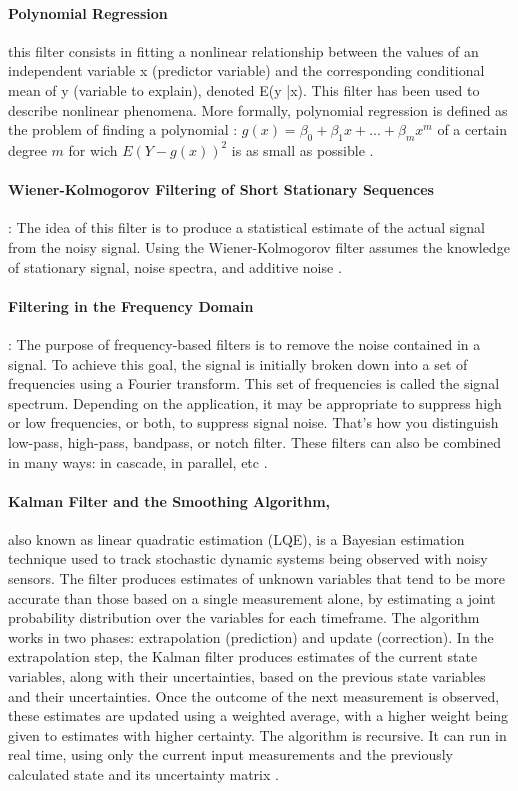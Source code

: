\paragraph{Polynomial Regression} this filter consists in fitting a nonlinear relationship between the values of an independent variable x (predictor variable)  and the corresponding conditional mean of y (variable to explain), denoted E(y |x). This filter has been used to describe nonlinear phenomena. More formally, polynomial regression is defined as the problem of finding a polynomial :  $g(x)=\beta_{0}+\beta_{1}x+...+\beta_{m}x^{m}$ of a certain degree $m$ for wich $E(Y-g(x))^{2}$ is as small as possible \cite{kendall1961advanced}.

\paragraph{Wiener-Kolmogorov Filtering of Short Stationary Sequences} : 
The idea of this filter is to produce a statistical estimate of the actual signal from the noisy signal. Using the Wiener-Kolmogorov filter assumes the knowledge of stationary signal, noise spectra, and additive noise \cite{pollock2007wiener}.

\paragraph{Filtering in the Frequency Domain}  : The purpose of frequency-based filters is to remove the noise contained in a signal. To achieve this goal, the signal is initially broken down into a set of frequencies using a Fourier transform. This set of frequencies is called the signal spectrum. Depending on the application, it may be appropriate to suppress high or low frequencies, or both, to suppress signal noise. That's how you distinguish low-pass, high-pass, bandpass, or notch filter. These filters can also be combined in many ways: in cascade, in parallel, etc \cite{buttkus2012spectral}.

\paragraph{Kalman Filter and the Smoothing Algorithm,} also known as linear quadratic estimation (LQE), is a Bayesian estimation technique used to track stochastic dynamic systems being observed with noisy sensors. The filter produces estimates of unknown variables that tend to be more accurate than those based on a single measurement alone, by estimating a joint probability distribution over the variables for each timeframe. The algorithm works in two phases: extrapolation (prediction) and update (correction). In the extrapolation step, the Kalman filter produces estimates of the current state variables, along with their uncertainties, based on the previous state variables and their uncertainties. Once the outcome of the next measurement is observed, these estimates are updated using a weighted average, with a higher weight being given to estimates with higher certainty. The algorithm is recursive. It can run in real time, using only the current input measurements and the previously calculated state and its uncertainty matrix \cite{matthies1989kalman}.



